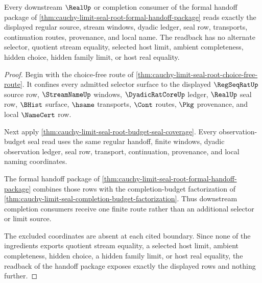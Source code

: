 \begin{theorem}
\label{thm:cauchy-limit-seal-root-formal-route-readback}
Every downstream $\RealUp$ or completion consumer of the formal handoff package of \autoref{thm:cauchy-limit-seal-root-formal-handoff-package} reads exactly the displayed regular source, stream windows, dyadic ledger, seal row, transports, continuation routes, provenance, and local name. The readback has no alternate selector, quotient stream equality, selected host limit, ambient completeness, hidden choice, hidden family limit, or host real equality.
\end{theorem}
\begin{proof}
Begin with the choice-free route of \autoref{thm:cauchy-limit-seal-root-choice-free-route}. It confines every admitted selector surface to the displayed $\RegSeqRatUp$ source row, $\StreamNameUp$ windows, $\DyadicRatCoreUp$ ledger, $\RealUp$ seal row, $\BHist$ surface, $\hsame$ transports, $\Cont$ routes, $\Pkg$ provenance, and local $\NameCert$ row.

Next apply \autoref{thm:cauchy-limit-seal-root-budget-seal-coverage}. Every observation-budget seal read uses the same regular handoff, finite windows, dyadic observation ledger, seal row, transport, continuation, provenance, and local naming coordinates.

The formal handoff package of \autoref{thm:cauchy-limit-seal-root-formal-handoff-package} combines those rows with the completion-budget factorization of \autoref{thm:cauchy-limit-seal-completion-budget-factorization}. Thus downstream completion consumers receive one finite route rather than an additional selector or limit source.

The excluded coordinates are absent at each cited boundary. Since none of the ingredients exports quotient stream equality, a selected host limit, ambient completeness, hidden choice, a hidden family limit, or host real equality, the readback of the handoff package exposes exactly the displayed rows and nothing further.
\end{proof}

